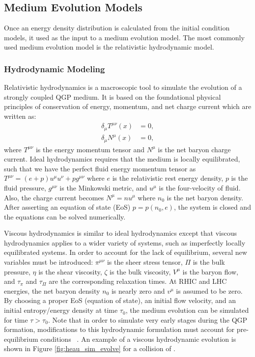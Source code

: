 \subsection{Medium Evolution Models}
Once an energy density distribution is calculated from the initial condition models, it used as the input to a medium evolution model. The most commonly used medium evolution model is the relativistic hydrodynamic model.

\subsubsection{Hydrodynamic Modeling}%
Relativistic hydrodynamics is a macroscopic tool to simulate the evolution of a strongly coupled QGP medium. It is based on the foundational physical principles of conservation of energy, momentum, and net charge current which are written as:
\begin{align}
\delta_{\mu} T^{\mu\nu}(x) &= 0,\\
\delta_{\mu} N^{\mu}(x) &= 0,
\end{align}
where $T^{\mu\nu}$ is the energy momentum tensor and $N^{\mu}$ is the net baryon charge current. Ideal hydrodynamics requires that the medium is locally equilibrated, such that we have the perfect fluid energy momentum tensor as $T^{\mu\nu} = (e+p)u^\mu u^\nu+pg^{\mu\nu}$ where $e$ is the relativistic rest energy density, $p$ is the fluid pressure, $g^{\mu\nu}$ is the Minkowski metric, and $u^\mu$ is the four-velocity of fluid. Also, the charge current becomes $N^\mu = nu^\mu$ where $n_0$ is the net baryon density. After asserting an equation of state (EoS) $p = p(n_0,e)$, the system is closed and the equations can be solved numerically.

Viscous hydrodynamics is similar to ideal hydrodynamics except that viscous hydrodynamics applies to a wider variety of systems, such as imperfectly locally equilibrated systems. In order to account for the lack of equilibrium, several new variables must be introduced: $\pi^{\mu\nu}$ is the sheer stress tensor, $\Pi$ is the bulk pressure, $\eta$ is the shear viscosity, $\zeta$ is the bulk viscosity, $V^\mu$ is the baryon flow, and $\tau_\pi$ and $\tau_\Pi$ are the corresponding relaxation times. At RHIC and LHC energies, the net baryon density $n_0$ is nearly zero and $v^\mu$ is assumed to be zero. By choosing a proper EoS (equation of state), an initial flow velocity, and an initial entropy/energy density at time $\tau_0$, the medium evolution can be simulated for time $\tau > \tau_0$. Note that in order to simulate very early stages during the QGP formation, modifications to this hydrodynamic formulation must account for pre-equilibrium conditions ~\cite{Song2015}. An example of a viscous hydrodynamic evolution is shown in Figure \ref{fig:heau_sim_evolve} for a collision of \hau.

